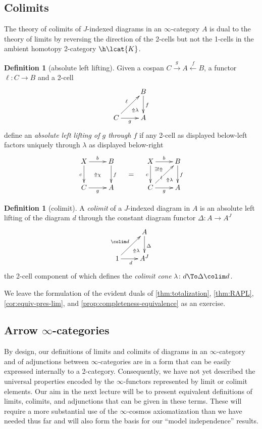 \documentclass[12pt,reqno]{amsart}
\theoremstyle{plain}
\theoremstyle{definition}
\newtheorem{defn}[thm]{Definition}
\theoremstyle{remark}
\numberwithin{equation}{subsection}
\begin{document}
\subsection{Colimits}

The theory of colimits of $J$-indexed diagrams in an $\infty$-category $A$  is dual to the theory of limits by reversing the direction of the 2-cells but not the 1-cells in the ambient homotopy 2-category $\h\lcat{K}$.


\begin{defn}[absolute left lifting] Given a cospan $C \xrightarrow{g} A \xleftarrow{f} B$, a functor $\ell \colon C \to B$ and a 2-cell \[\xymatrix{ \ar@{}[dr]|(.7){\Uparrow\lambda} & B \ar[d]^f \\ C \ar[ur]^\ell \ar[r]_g & A}\] define an \emph{absolute left lifting of $g$ through $f$} if any 2-cell as displayed below-left factors uniquely through $\lambda$ as displayed below-right
\[    \vcenter{\xymatrix{ X \ar[d]_c \ar[r]^b \ar@{}[dr]|{\Uparrow\chi} & B \ar[d]^f \\ C \ar[r]_g & A}} \mkern20mu = \mkern20mu \vcenter{\xymatrix{ X \ar[d]_c \ar[r]^b \ar@{}[dr]|(.3){\exists !\Uparrow}|(.7){\Uparrow\lambda} & B \ar[d]^f \\ C \ar[ur]|(.4)*+<2pt>{\scriptstyle \ell} \ar[r]_g & A}}
\]
\end{defn}

\begin{defn}[colimit]\label{defn:colimit} A \emph{colimit} of a $J$-indexed diagram in $A$ is an absolute left lifting of the diagram $d$ through the constant diagram functor $\Delta \colon A \to A^J$
\[ \xymatrix{ \ar@{}[dr]|(.7){\Uparrow\lambda} & A\ar[d]^\Delta \\ 1 \ar[r]_d \ar[ur]^{\colim d} & A^J}\] the 2-cell component of which  defines the \emph{colimit cone} $\lambda \colon d \To \Delta \colim d$.
\end{defn}

We leave the formulation of the evident duals of \ref{thm:totalization}, \ref{thm:RAPL}, \ref{cor:equiv-pres-lim}, and \ref{prop:completeness-equivalence} as an exercise.


\subsection{Arrow \texorpdfstring{$\infty$}{infinity}-categories}

By design, our definitions of limits and colimits of diagrams in an $\infty$-category and of adjunctions between $\infty$-categories are in a form that can be easily expressed internally to a 2-category. Consequently, we have not yet described  the universal properties encoded by the $\infty$-functors represented by limit or colimit elements.  Our aim in the next lecture will be to present equivalent definitions of limits, colimits, and adjunctions that can be given in these terms. These will require a more substantial use of the $\infty$-cosmos axiomatization than we have needed thus far and will also form the basis for our ``model independence'' results.
\end{document}
